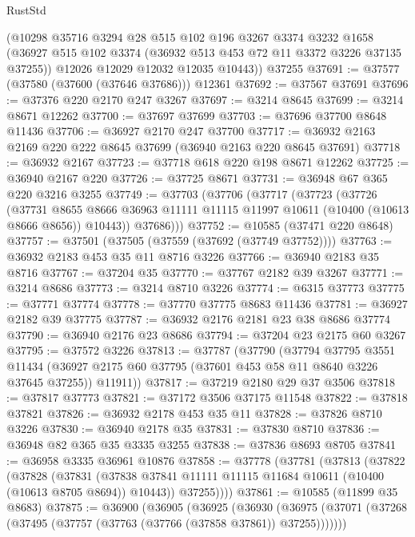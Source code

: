 \begin{lexlean}{RustStd}
\begin{coremodule}
      (@10298
        @35716
        @3294
        @28
        @515
        @102
        @196
        @3267
        @3374
        @3232
        @1658
        (@36927 @515 @102 @3374 (@36932 @513 @453 @72 @11 @3372 @3226 @37135 @37255))
        @12026
        @12029
        @12032
        @12035
        @10443))
    @37255
@37691 := @37577 (@37580 (@37600 (@37646 @37686))) @12361
@37692 := @37567 @37691
@37696 := @37376 @220 @2170 @247 @3267
@37697 := @3214 @8645
@37699 := @3214 @8671 @12262
@37700 := @37697 @37699
@37703 := @37696 @37700 @8648 @11436
@37706 := @36927 @2170 @247 @37700
@37717 := @36932 @2163 @2169 @220 @222 @8645 @37699 (@36940 @2163 @220 @8645 @37691)
@37718 := @36932 @2167
@37723 := @37718 @618 @220 @198 @8671 @12262
@37725 := @36940 @2167 @220
@37726 := @37725 @8671
@37731 := @36948 @67 @365 @220 @3216 @3255
@37749 := @37703
    (@37706
      (@37717
        (@37723
          (@37726
            (@37731
              @8655
              @8666
              @36963
              @11111
              @11115
              @11997
              @10611
              (@10400 (@10613 @8666 @8656))
              @10443))
          @37686)))
@37752 := @10585 (@37471 @220 @8648)
@37757 := @37501 (@37505 (@37559 (@37692 (@37749 @37752))))
@37763 := @36932 @2183 @453 @35 @11 @8716 @3226
@37766 := @36940 @2183 @35 @8716
@37767 := @37204 @35
@37770 := @37767 @2182 @39 @3267
@37771 := @3214 @8686
@37773 := @3214 @8710 @3226
@37774 := @6315 @37773
@37775 := @37771 @37774
@37778 := @37770 @37775 @8683 @11436
@37781 := @36927 @2182 @39 @37775
@37787 := @36932 @2176 @2181 @23 @38 @8686 @37774
@37790 := @36940 @2176 @23 @8686
@37794 := @37204 @23 @2175 @60 @3267
@37795 := @37572 @3226
@37813 := @37787
    (@37790
      (@37794
        @37795
        @3551
        @11434
        (@36927 @2175 @60 @37795 (@37601 @453 @58 @11 @8640 @3226 @37645 @37255))
        @11911))
@37817 := @37219 @2180 @29 @37 @3506
@37818 := @37817 @37773
@37821 := @37172 @3506 @37175 @11548
@37822 := @37818 @37821
@37826 := @36932 @2178 @453 @35 @11
@37828 := @37826 @8710 @3226
@37830 := @36940 @2178 @35
@37831 := @37830 @8710
@37836 := @36948 @82 @365 @35 @3335 @3255
@37838 := @37836 @8693 @8705
@37841 := @36958 @3335 @36961 @10876
@37858 := @37778
    (@37781
      (@37813
        (@37822
          (@37828
            (@37831
              (@37838 @37841 @11111 @11115 @11684 @10611 (@10400 (@10613 @8705 @8694)) @10443))
            @37255))))
@37861 := @10585 (@11899 @35 @8683)
@37875 := @36900
    (@36905
      (@36925
        (@36930
          (@36975 (@37071 (@37268 (@37495 (@37757 (@37763 (@37766 (@37858 @37861)) @37255)))))))

\end{coremodule}
\end{lexlean}
